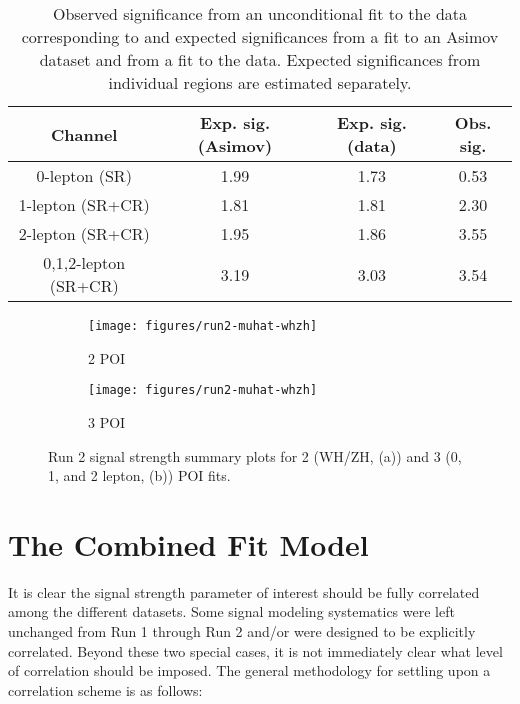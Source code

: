\begin{table}[!htbp]\captionsetup{justification=centering}
  \centering
  \begin{tabular}{c|||c|c|c}
     \hline\hline
    Channel  & Exp. sig. (Asimov) & Exp. sig. (data) & Obs. sig. \\
     \hline\hline
    0-lepton (SR)          	& 1.99  & 1.73 & 0.53 \\
    1-lepton (SR+CR)     	&  1.81 & 1.81 & 2.30 \\
    2-lepton (SR+CR)         	& 1.95  & 1.86 & 3.55 \\ %
    \hline\hline
    0,1,2-lepton (SR+CR)    &  3.19 & 3.03 & 3.54 \\
    \hline\hline
  \end{tabular}
  \caption{Observed significance from an unconditional fit to the data corresponding to \LUMI and expected significances from a fit to an Asimov dataset and from a fit to the data. Expected significances from individual regions are estimated separately. } 
  \label{tab:nuis_sig}
\end{table}

\begin{figure}[!htbp]\captionsetup{justification=centering}
  \centering
  \begin{subfigure}[t]{0.49\textwidth}\centering\texttt{[image: figures/run2-muhat-whzh]}\caption{2 POI}\end{subfigure}
  \begin{subfigure}[t]{0.49\textwidth}\centering\texttt{[image: figures/run2-muhat-whzh]}\caption{3 POI}\end{subfigure}
    \caption{Run 2 signal strength summary plots for 2 (WH/ZH, (a)) and 3 (0, 1, and 2 lepton, (b)) POI fits.}
    \label{fig:r2muhat}
\end{figure}

\clearpage

\section{The Combined Fit Model}
\label{sec:combmodel}
It is clear the signal strength parameter of interest should be fully correlated among the different datasets.  Some signal modeling systematics were left unchanged from Run 1 through Run 2 and/or were designed to be explicitly correlated.  Beyond these two special cases, it is not immediately clear what level of correlation should be imposed.  The general methodology for settling upon a correlation scheme is as follows:

